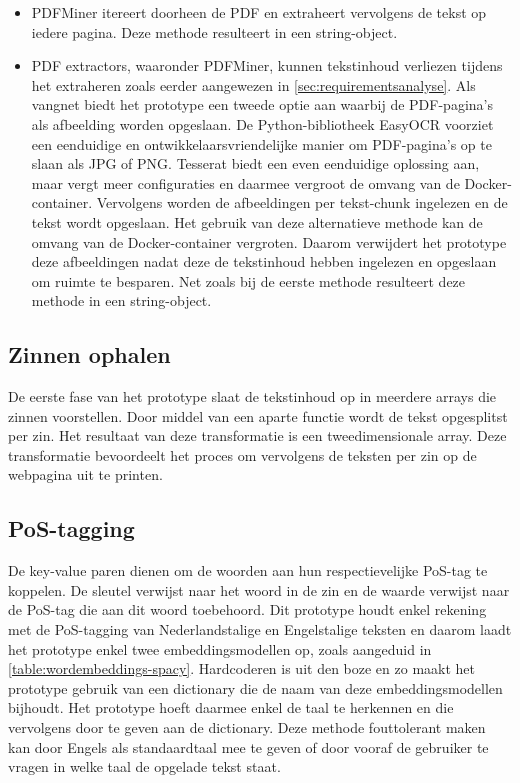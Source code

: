 \begin{itemize}
	\item PDFMiner itereert doorheen de PDF en extraheert vervolgens de tekst op iedere pagina. Deze methode resulteert in een string-object.
	\item PDF extractors, waaronder PDFMiner, kunnen tekstinhoud verliezen tijdens het extraheren zoals eerder aangewezen in \ref{sec:requirementsanalyse}. Als vangnet biedt het prototype een tweede optie aan waarbij de PDF-pagina's als afbeelding worden opgeslaan. De Python-bibliotheek EasyOCR voorziet een eenduidige en ontwikkelaarsvriendelijke manier om PDF-pagina's op te slaan als JPG of PNG. Tesserat biedt een even eenduidige oplossing aan, maar vergt meer configuraties en daarmee vergroot de omvang van de Docker-container. Vervolgens worden de afbeeldingen per tekst-chunk ingelezen en de tekst wordt opgeslaan. Het gebruik van deze alternatieve methode kan de omvang van de Docker-container vergroten. Daarom verwijdert het prototype deze afbeeldingen nadat deze de tekstinhoud hebben ingelezen en opgeslaan om ruimte te besparen. Net zoals bij de eerste methode resulteert deze methode in een string-object.
\end{itemize}


\subsection{Zinnen ophalen}

De eerste fase van het prototype slaat de tekstinhoud op in meerdere arrays die zinnen voorstellen. Door middel van een aparte functie wordt de tekst opgesplitst per zin. Het resultaat van deze transformatie is een tweedimensionale array. Deze transformatie bevoordeelt het proces om vervolgens de teksten per zin op de webpagina uit te printen. 

\subsection{PoS-tagging}

De key-value paren dienen om de woorden aan hun respectievelijke PoS-tag te koppelen. De sleutel verwijst naar het woord in de zin en de waarde verwijst naar de PoS-tag die aan dit woord toebehoord.  Dit prototype houdt enkel rekening met de PoS-tagging van Nederlandstalige en Engelstalige teksten en daarom laadt het prototype enkel twee embeddingsmodellen op, zoals aangeduid in \ref{table:wordembeddings-spacy}. Hardcoderen is uit den boze en zo maakt het prototype gebruik van een dictionary die de naam van deze embeddingsmodellen bijhoudt. Het prototype hoeft daarmee enkel de taal te herkennen en die vervolgens door te geven aan de dictionary. Deze methode fouttolerant maken kan door Engels als standaardtaal mee te geven of door vooraf de gebruiker te vragen in welke taal de opgelade tekst staat.

